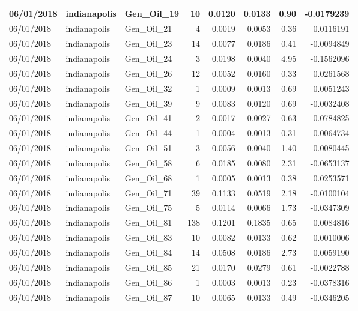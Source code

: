 \documentclass[
  letterpaper,
  DIV=11,
  numbers=noendperiod]{scrartcl}
\begin{document}
\begin{tabular}{l|l|l|r|r|r|r|r}
\hline
06/01/2018 & indianapolis & Gen\_Oil\_19 & 10 & 0.0120 & 0.0133 & 0.90 & -0.0179239\\
\hline
06/01/2018 & indianapolis & Gen\_Oil\_21 & 4 & 0.0019 & 0.0053 & 0.36 & 0.0116191\\
\hline
06/01/2018 & indianapolis & Gen\_Oil\_23 & 14 & 0.0077 & 0.0186 & 0.41 & -0.0094849\\
\hline
06/01/2018 & indianapolis & Gen\_Oil\_24 & 3 & 0.0198 & 0.0040 & 4.95 & -0.1562096\\
\hline
06/01/2018 & indianapolis & Gen\_Oil\_26 & 12 & 0.0052 & 0.0160 & 0.33 & 0.0261568\\
\hline
06/01/2018 & indianapolis & Gen\_Oil\_32 & 1 & 0.0009 & 0.0013 & 0.69 & 0.0051243\\
\hline
06/01/2018 & indianapolis & Gen\_Oil\_39 & 9 & 0.0083 & 0.0120 & 0.69 & -0.0032408\\
\hline
06/01/2018 & indianapolis & Gen\_Oil\_41 & 2 & 0.0017 & 0.0027 & 0.63 & -0.0784825\\
\hline
06/01/2018 & indianapolis & Gen\_Oil\_44 & 1 & 0.0004 & 0.0013 & 0.31 & 0.0064734\\
\hline
06/01/2018 & indianapolis & Gen\_Oil\_51 & 3 & 0.0056 & 0.0040 & 1.40 & -0.0080445\\
\hline
06/01/2018 & indianapolis & Gen\_Oil\_58 & 6 & 0.0185 & 0.0080 & 2.31 & -0.0653137\\
\hline
06/01/2018 & indianapolis & Gen\_Oil\_68 & 1 & 0.0005 & 0.0013 & 0.38 & 0.0253571\\
\hline
06/01/2018 & indianapolis & Gen\_Oil\_71 & 39 & 0.1133 & 0.0519 & 2.18 & -0.0100104\\
\hline
06/01/2018 & indianapolis & Gen\_Oil\_75 & 5 & 0.0114 & 0.0066 & 1.73 & -0.0347309\\
\hline
06/01/2018 & indianapolis & Gen\_Oil\_81 & 138 & 0.1201 & 0.1835 & 0.65 & 0.0084816\\
\hline
06/01/2018 & indianapolis & Gen\_Oil\_83 & 10 & 0.0082 & 0.0133 & 0.62 & 0.0010006\\
\hline
06/01/2018 & indianapolis & Gen\_Oil\_84 & 14 & 0.0508 & 0.0186 & 2.73 & 0.0059190\\
\hline
06/01/2018 & indianapolis & Gen\_Oil\_85 & 21 & 0.0170 & 0.0279 & 0.61 & -0.0022788\\
\hline
06/01/2018 & indianapolis & Gen\_Oil\_86 & 1 & 0.0003 & 0.0013 & 0.23 & -0.0378316\\
\hline
06/01/2018 & indianapolis & Gen\_Oil\_87 & 10 & 0.0065 & 0.0133 & 0.49 & -0.0346205\\

\end{tabular}
\end{document}
